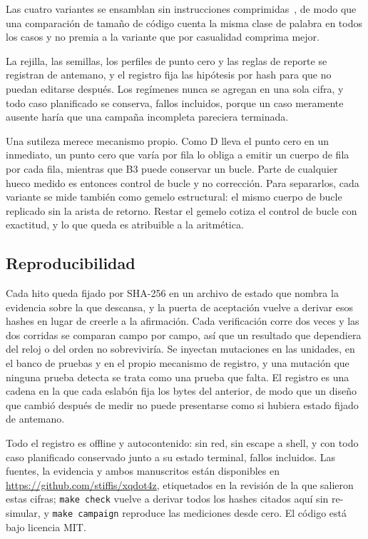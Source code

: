 Las cuatro variantes se ensamblan sin instrucciones
comprimidas~\cite{riscvc}, de modo que una comparación de tamaño de código
cuenta la misma clase de palabra en todos los casos y no premia a la variante
que por casualidad comprima mejor.

La rejilla, las semillas, los perfiles de punto cero y las reglas de reporte se
registran de antemano, y el registro fija las hipótesis por hash para que no
puedan editarse después. Los regímenes nunca se agregan en una sola cifra, y
todo caso planificado se conserva, fallos incluidos, porque un caso meramente
ausente haría que una campaña incompleta pareciera terminada.

Una sutileza merece mecanismo propio. Como D lleva el punto cero en un
inmediato, un punto cero que varía por fila lo obliga a emitir un cuerpo de fila
por cada fila, mientras que B3 puede conservar un bucle. Parte de cualquier
hueco medido es entonces control de bucle y no corrección. Para separarlos, cada
variante se mide también como gemelo estructural: el mismo cuerpo de bucle
replicado sin la arista de retorno. Restar el gemelo cotiza el control de bucle
con exactitud, y lo que queda es atribuible a la aritmética.

\subsection{Reproducibilidad}
Cada hito queda fijado por SHA-256 en un archivo de estado que nombra la
evidencia sobre la que descansa, y la puerta de aceptación vuelve a derivar esos
hashes en lugar de creerle a la afirmación. Cada verificación corre dos veces y
las dos corridas se comparan campo por campo, así que un resultado que
dependiera del reloj o del orden no sobreviviría. Se inyectan mutaciones en las
unidades, en el banco de pruebas y en el propio mecanismo de registro, y una
mutación que ninguna prueba detecta se trata como una prueba que falta. El
registro es una cadena en la que cada eslabón fija los bytes del anterior, de
modo que un diseño que cambió después de medir no puede presentarse como si
hubiera estado fijado de antemano.

Todo el registro es offline y autocontenido: sin red, sin escape a shell, y con
todo caso planificado conservado junto a su estado terminal, fallos incluidos.
Las fuentes, la evidencia y ambos manuscritos están disponibles en
\url{https://github.com/stiffis/xqdot4z}, etiquetados en la revisión de la que
salieron estas cifras; \texttt{make check} vuelve a derivar todos los hashes
citados aquí sin re-simular, y \texttt{make campaign} reproduce las mediciones
desde cero. El código está bajo licencia MIT.

